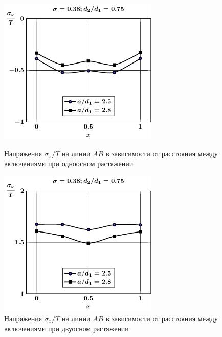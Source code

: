 \begin{russian}
\begin{figure}[h!]
\centering\footnotesize
\parbox[b]{7.5cm}{\centering\includegraphics[width=7.6cm]{periodic-inc27-a-d75-g25-t1-sig_x.pdf}
\caption{Напряжения $\sigma_x/T$ на линии $AB$ в зависимости от расстояния между включениями при одноосном растяжении
\label{f:11:25}}}\hfil\hfil
\parbox[b]{7.5cm}{\centering\includegraphics[width=7.6cm]{periodic-inc27-a-d75-g25-t2-sig_x.pdf}
\caption{Напряжения $\sigma_x/T$ на линии $AB$ в зависимости от расстояния между включениями при двуосном растяжении
\label{f:11:26}}}
\end{figure}


\end{russian}
